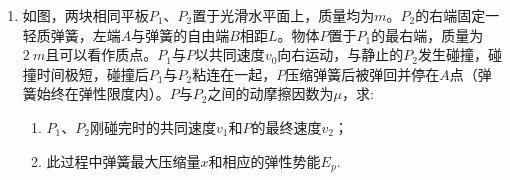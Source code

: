 \begin{enumerate}[leftmargin=0em]
\begin{enumerate}
\end{enumerate}
\begin{figure}[h!]
\flushright

\end{figure}








\item 
{}
如图，两块相同平板$ P_{1} $、$ P_{2} $置于光滑水平面上，质量均为$ m $。$ P_{2} $的右端固定一轻质弹簧，左端$ A $与弹簧的自由端$ B $相距$ L $。物体$ P $置于$ P_{1} $的最右端，质量为$ 2 \ m $且可以看作质点。$ P_{1} $与$ P $以共同速度$ v_{0} $向右运动，与静止的$ P_{2} $发生碰撞，碰撞时间极短，碰撞后$ P_{1} $与$ P_{2} $粘连在一起，$ P $压缩弹簧后被弹回并停在$ A $点（弹簧始终在弹性限度内）。$ P $与$ P_{2} $之间的动摩擦因数为$ \mu $，求:
\begin{enumerate}
\renewcommand{\labelenumi}{\arabic{enumi}.}
\item
$ P_{1} $、$ P_{2} $刚碰完时的共同速度$ v_{1} $和$ P $的最终速度$ v_{2} $；
\item 
此过程中弹簧最大压缩量$ x $和相应的弹性势能$ E_p $.


\end{enumerate}
\begin{figure}[h!]
\flushright

\end{figure}

\end{enumerate}
